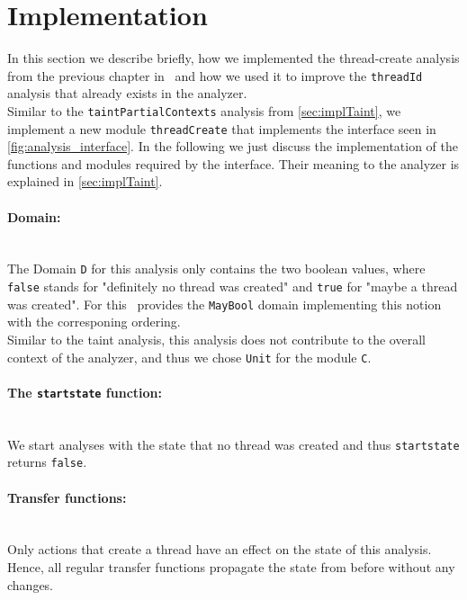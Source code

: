   

  \section{Implementation}
    In this section we describe briefly, how we implemented the thread-create analysis from the previous chapter in \gob\ and how we used it to improve the \texttt{threadId} analysis that already exists in the analyzer.\\
    Similar to the \texttt{taintPartialContexts} analysis from \autoref{sec:implTaint}, we implement a new module \texttt{threadCreate} that implements the interface seen in \autoref{fig:analysis_interface}. In the following we just discuss the implementation of the functions and modules required by the interface. Their meaning to the analyzer is explained in \autoref{sec:implTaint}.

    \paragraph{Domain:}\mbox{}\\
    The Domain \texttt{D} for this analysis only contains the two boolean values, where \texttt{false} stands for "definitely no thread was created" and \texttt{true} for "maybe a thread was created". For this \gob\ provides the \texttt{MayBool} domain implementing this notion with the corresponing ordering.\\
    Similar to the taint analysis, this analysis does not contribute to the overall context of the analyzer, and thus we chose \texttt{Unit} for the module \texttt{C}.

    \paragraph{The \texttt{startstate} function:}\mbox{}\\
    We start analyses with the state that no thread was created and thus \texttt{startstate} returns \texttt{false}.

    \paragraph{Transfer functions:}\mbox{}\\
    Only actions that create a thread have an effect on the state of this analysis. Hence, all regular transfer functions propagate the state from before without any changes.

